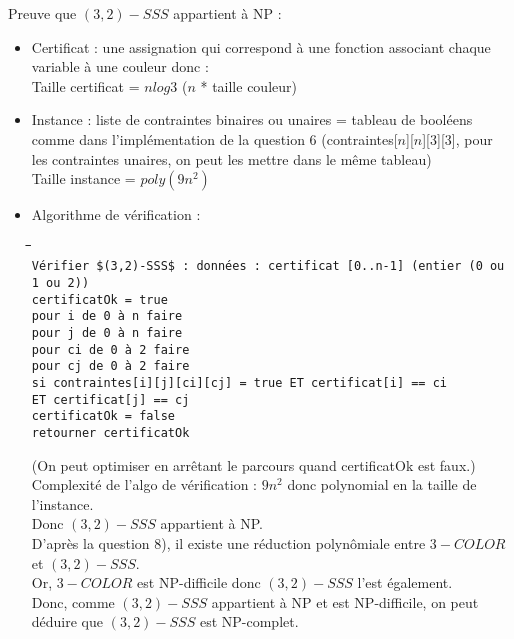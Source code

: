 \documentclass{report}
\begin{document}
Preuve que $(3,2)-SSS$ appartient à NP :
\begin{itemize}
\item Certificat : une assignation qui correspond à une fonction associant chaque variable à une couleur donc :\\
Taille certificat = $n log 3$  ($n$ * taille couleur)

\item Instance : liste de contraintes binaires ou unaires = tableau de booléens comme dans l'implémentation de la question 6 (contraintes[$n$][$n$][3][3], pour les contraintes unaires, on peut les mettre dans le même tableau)\\
Taille instance = $poly(9n^{2})$

\item Algorithme de vérification :

  \begin{tabbing}
    \hspace{0.3cm}\=\hspace{0.3cm}\=\hspace{0.3cm}\=\hspace{0.3cm}\=\hspace{0.3cm}\=\hspace{0.3cm}\=\hspace{3cm}\=\\
    \verb|Vérifier $(3,2)-SSS$ : données : certificat [0..n-1] (entier (0 ou 1 ou 2))|\\
    \>\verb|certificatOk = true|\\
    \>\verb|pour i de 0 à n faire|\\
    \>\>\verb|pour j de 0 à n faire|\\
    \>\>\>\verb|pour ci de 0 à 2 faire|\\
    \>\>\>\>\verb|pour cj de 0 à 2 faire|\\
    \>\>\>\>\>\verb|si contraintes[i][j][ci][cj] = true ET certificat[i] == ci|\\
    \>\>\>\>\>\>\>\verb|ET certificat[j] == cj|\\
    \>\>\>\>\>\>\verb|certificatOk = false|\\
    \>\verb|retourner certificatOk|\\
  \end{tabbing}

(On peut optimiser en arrêtant le parcours quand certificatOk est faux.)\\
Complexité de l'algo de vérification : $9n^{2}$ donc polynomial en la taille de l'instance.\\
Donc $(3,2)-SSS$ appartient à NP.\\
D'après la question 8), il existe une réduction polynômiale entre $3-COLOR$ et $(3,2)-SSS$.\\
Or, $3-COLOR$ est NP-difficile donc $(3,2)-SSS$ l'est également.\\
Donc, comme $(3,2)-SSS$ appartient à NP et est NP-difficile, on peut déduire que $(3,2)-SSS$ est NP-complet.
\end{itemize}
\end{document}
